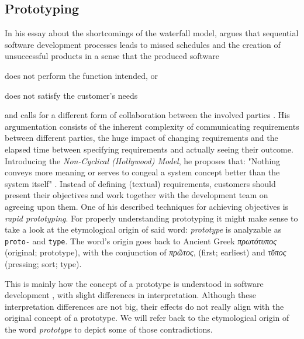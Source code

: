 \subsection{Prototyping}
In his essay  about the shortcomings of the waterfall model, \citeauthor{gladden_stop_1982} argues that sequential software development processes leads to missed schedules and the creation of unsuccessful products in a sense that the produced software \begin{enumerate*}[label=(\roman*)]
\item does not perform the function intended, or
\item does not satisfy the customer's needs
\end{enumerate*}
and calls for a different form of collaboration between the involved parties \cite{gladden_stop_1982}.
His argumentation consists of the inherent complexity of communicating requirements between different parties, the huge impact of changing requirements and the elapsed time between specifying requirements and actually seeing their outcome.
Introducing the \emph{Non-Cyclical (Hollywood) Model}, he proposes that: "Nothing conveys more meaning or serves to congeal a system concept better than the system itself" \cite{gladden_stop_1982}.
Instead of defining (textual) requirements, customers should present their objectives and work together with the development team on agreeing upon them.
One of his described techniques for achieving objectives is \emph{rapid prototyping}.
For properly understanding prototyping it might make sense to take a look at the etymological origin of said word: \emph{prototype} is analyzable as \texttt{proto-} and \texttt{type}.
The word's origin goes back to Ancient Greek \emph{\textgreek{πρωτότυπος}} (original; prototype), with the conjunction of \emph{\textgreek{πρῶτος}}, (first; earliest) and \emph{\textgreek{τῠπος}} (pressing; sort; type). %

This is mainly how the concept of a prototype is understood in software development \cite{budde_what_1992}, with slight differences in interpretation.
Although these interpretation differences are not big, their effects do not really align with the original concept of a prototype.
We will refer back to the etymological origin of the word \emph{prototype} to depict some of those contradictions.

